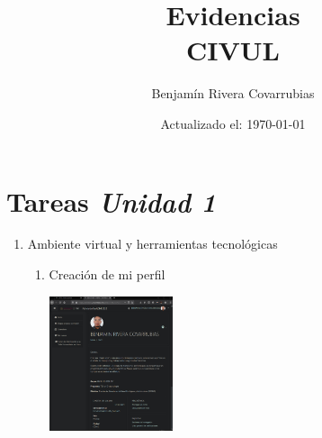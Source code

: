 \documentclass[11pt]{article}
\title{Evidencias \\\bf{CIVUL}}
\author{Benjam\'in Rivera Covarrubias}
\date{Actualizado el: \today}
\begin{document}
\maketitle


\part *{Tareas \it Unidad 1}
	\begin{enumerate}[{\bf Sesi\'on} 1{.}]

		\item {Ambiente virtual y herramientas tecnológicas}
			\begin{enumerate}[{\bf Actividad} 1{.}]
				
				\item {Creación de mi perfil}
					\begin{multicols}{2}			
						\includegraphics[width=0.3\textwidth]{CIVUL-U1-S1-A1-1}
					\end{multicols}
					

\end{enumerate}
\end{enumerate}
\end{document}
